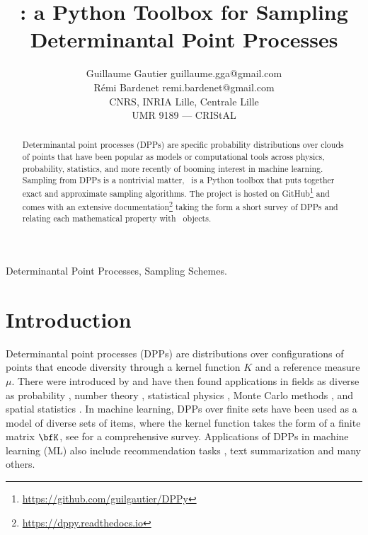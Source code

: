 \documentclass[twoside,11pt]{article}
\begin{document}
\title{\DPPy: a Python Toolbox for Sampling Determinantal Point Processes}

\author{\name Guillaume Gautier \email guillaume.gga@gmail.com \\
       \name R\'emi Bardenet \email remi.bardenet@gmail.com \\
       \addr CNRS, INRIA Lille, Centrale Lille\\
       UMR 9189 — CRIStAL}

\editor{}

\maketitle

\setcounter{footnote}{3}
\begin{abstract}%

  Determinantal point processes (DPPs) are specific probability distributions over clouds of points that have been popular as models or computational tools across physics, probability, statistics, and more recently of booming interest in machine learning. 
  Sampling from DPPs is a nontrivial matter, \DPPy\ is a Python toolbox that puts together exact and approximate sampling algorithms.
  The project is hosted on GitHub\footnote{\url{https://github.com/guilgautier/DPPy}} and comes with an extensive documentation\footnote{\label{fn:docs}\url{https://dppy.readthedocs.io}} taking the form a short survey of DPPs and relating each mathematical property with \DPPy\ objects.
  
\end{abstract}

\begin{keywords}
  Determinantal Point Processes, Sampling Schemes.
\end{keywords}

\section{Introduction} %
\label{sec:introduction}

  Determinantal point processes (DPPs) are distributions over configurations of points that encode diversity through a kernel function $K$ and a reference measure $\mu$.
  There were introduced by \citet{Mac75} and have then found applications in fields as diverse as probability \citep{Sos00, Kon05, HKPV06}, number theory \citep{RuSa96}, statistical physics \citep{PaBe11}, Monte Carlo methods \citep{BaHa16}, and spatial statistics \citep{LaMoRu15}. 
  In machine learning, DPPs over finite sets have been used as a model of diverse sets of items, where the kernel function takes the form of a finite matrix $\bfK$, see \citet{KuTa12} for a comprehensive survey. 
  Applications of DPPs in machine learning (ML) also include recommendation tasks \citep{KaDeKo16, GaPaKo16}, text summarization \citep{DuBa16} and many others.\\
\end{document}
